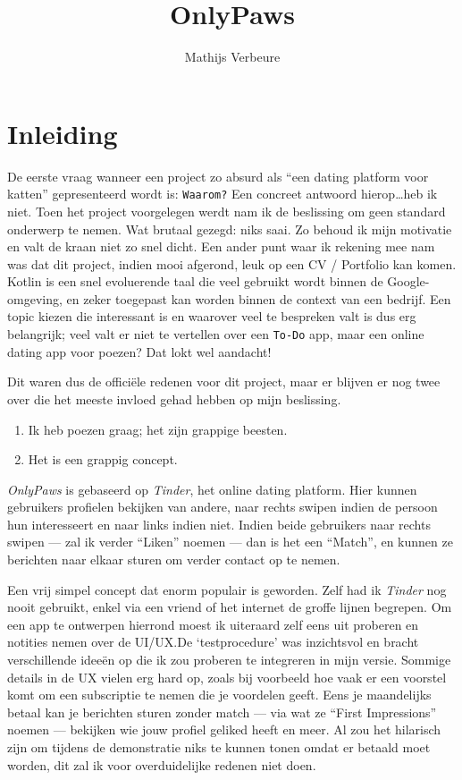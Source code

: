 \documentclass{article}
\title{OnlyPaws}
\author{Mathijs Verbeure}
\begin{document}
\maketitle


\section{Inleiding}
De eerste vraag wanneer een project zo absurd als ``een dating platform voor katten'' gepresenteerd wordt is: \verb|Waarom?| Een concreet antwoord hierop\dots heb ik niet.
Toen het project voorgelegen werdt nam ik de beslissing om geen standard onderwerp te nemen. Wat brutaal gezegd: niks saai.
Zo behoud ik mijn motivatie en valt de kraan niet zo snel dicht.
Een ander punt waar ik rekening mee nam was dat dit project, indien mooi afgerond, leuk op een CV / Portfolio kan komen. 
Kotlin is een snel evoluerende taal die veel gebruikt wordt binnen de Google-omgeving, en zeker toegepast kan worden binnen de context van een bedrijf.
Een topic kiezen die interessant is en waarover veel te bespreken valt is dus erg belangrijk; veel valt er niet te vertellen over een \verb|To-Do| app, maar een online dating app voor poezen? Dat lokt wel aandacht!

Dit waren dus de officiële redenen voor dit project, maar er blijven er nog twee over die het meeste invloed gehad hebben op mijn beslissing. 
\begin{enumerate}
    \item Ik heb poezen graag; het zijn grappige beesten.
    \item Het is een grappig concept.
\end{enumerate}


\textit{OnlyPaws} is gebaseerd op \textit{Tinder}\texttrademark, het online dating platform. Hier kunnen gebruikers profielen bekijken van andere, naar rechts swipen indien de persoon hun interesseert en naar links indien niet.
Indien beide gebruikers naar rechts swipen --- zal ik verder ``Liken'' noemen --- dan is het een ``Match'', en kunnen ze berichten naar elkaar sturen om verder contact op te nemen.

Een vrij simpel concept dat enorm populair is geworden. Zelf had ik \textit{Tinder} nog nooit gebruikt, enkel via een vriend of het internet de groffe lijnen begrepen.
Om een app te ontwerpen hierrond moest ik uiteraard zelf eens uit proberen en notities nemen over de UI/UX.\@ De `testprocedure' was inzichtsvol en bracht verschillende ideeën op die ik zou proberen te integreren in mijn versie.
Sommige details in de UX vielen erg hard op, zoals bij voorbeeld hoe vaak er een voorstel komt om een subscriptie te nemen die je voordelen geeft. Eens je maandelijks betaal kan je berichten sturen zonder match --- via wat ze ``First Impressions'' noemen --- bekijken wie jouw profiel geliked heeft en meer.
Al zou het hilarisch zijn om tijdens de demonstratie niks te kunnen tonen omdat er betaald moet worden, dit zal ik voor overduidelijke redenen niet doen. 
\end{document}
